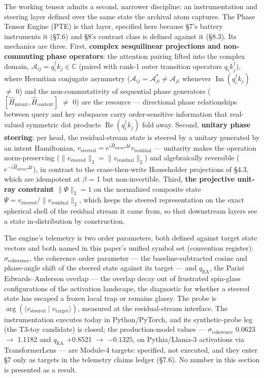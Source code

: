 \documentclass[11pt]{article}
\begin{document}
The working tensor admits a second, narrower discipline: an instrumentation and steering layer defined over the same state the archival atom captures. The Phase Tensor Engine (PTE) is that layer, specified here because \S{}7's battery instruments it (\S{}7.6) and \S{}8's contrast class is defined against it (\S{}8.3). Its mechanics are three. First, \textbf{complex sesquilinear projections and non-commuting phase operators}: the attention pairing lifted into the complex domain, \(\mathcal{A}_{ij} = q_i^\dagger k_j \in \mathbb{C}\) (paired with rank-1 outer transition operators \(q_i k_j^{\dagger}\)), where Hermitian conjugate asymmetry (\(\mathcal{A}_{ij} = \mathcal{A}_{ji}^{*} \neq \mathcal{A}_{ji}\) whenever \(\operatorname{Im}(q_i^\dagger k_j)\) \(\neq\) 0) and the non-commutativity of sequential phase generators (\([\hat{H}_{\text{intent}}, \hat{H}_{\text{context}}]\) \(\neq\) 0) are the resource --- directional phase relationships between query and key subspaces carry order-sensitive information that real-valued symmetric dot products \(\operatorname{Re}(q_i^\dagger k_j)\) fold away. Second, \textbf{unitary phase steering}: per head, the residual-stream state is steered by a unitary generated by an intent Hamiltonian, \(v_{\text{steered}} = e^{i\hat{H}_{\text{intent}}\Delta t} v_{\text{residual}}\) --- unitarity makes the operation norm-preserving (\(\lVert v_{\text{steered}}\rVert_2 = \lVert v_{\text{residual}}\rVert_2\)) and algebraically reversible (\(e^{-i\hat{H}_{\text{intent}}\Delta t}\)), in contrast to the erase-then-write Householder projections of \S{}4.3, which are idempotent at \(\beta\) = 1 but non-invertible. Third, \textbf{the projective unit-ray constraint} \(\lVert\Psi\rVert_2 = 1\) on the normalized composite state \(\Psi = v_{\text{steered}} / \lVert v_{\text{residual}}\rVert_2\), which keeps the steered representation on the exact spherical shell of the residual stream it came from, so that downstream layers see a state in-distribution by construction.

The engine's telemetry is two order parameters, both defined against target state vectors and both named in this paper's unified symbol set (convention register): \(\sigma_{\text{coherence}}\), the coherence order parameter --- the baseline-subtracted cosine and phase-angle shift of the steered state against its target --- and \(q_{\text{EA}}\), the Parisi Edwards--Anderson overlap --- the overlap decay out of frustrated spin-glass configurations of the activation landscape, the diagnostic for whether a steered state has escaped a frozen local trap or remains glassy. The probe is \(\arg(\langle v_{\text{steered}} \mid v_{\text{target}}\rangle)\), measured at the residual-stream interface. The instrumentation executes today in Python/PyTorch, and its synthetic-probe leg (the T3-toy candidate) is closed; the production-model values --- \(\sigma_{\text{coherence}}\) 0.0623 \(\to\) 1.1182 and \(q_{\text{EA}}\) +0.8521 \(\to\) \(-0.1325\), on Pythia/Llama-3 activations via TransformerLens --- are Module-4 targets: specified, not executed, and they enter \S{}7 only as targets in the telemetry claims ledger (\S{}7.6). No number in this section is presented as a result.
\end{document}
